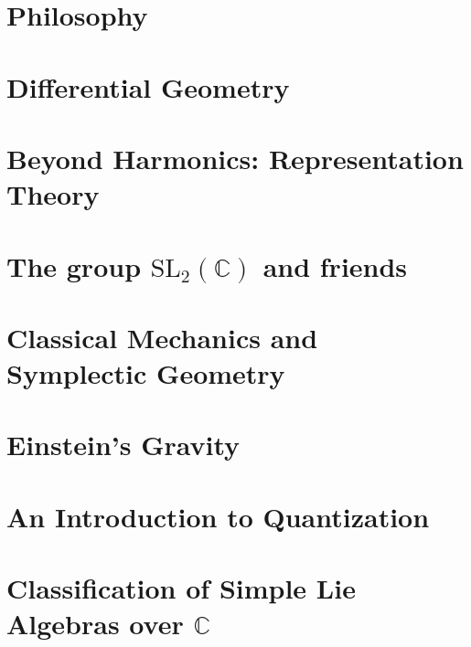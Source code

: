 \documentclass[11pt]{book}
\begin{document}
 
	









\chapter{Philosophy}

\chapter{Differential Geometry}


\chapter{Beyond Harmonics: Representation Theory}


\chapter{The group $\mathrm{SL}_2 (\mathbb{C})$ and friends}

\chapter{Classical Mechanics and Symplectic Geometry}

\chapter{Einstein's Gravity}

\chapter{An Introduction to Quantization}

\chapter{Classification of Simple Lie Algebras over $\mathbb{C}$}



\printindex
\end{document}
